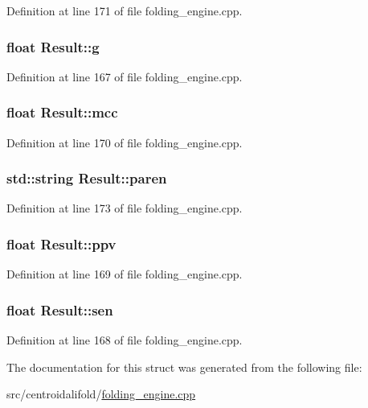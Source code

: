 Definition at line 171 of file folding\+\_\+engine.\+cpp.

\hypertarget{struct_result_abc9ebc61c9bf5c894e28a41bbded49df}{
\subsubsection[{g}]{\setlength{\rightskip}{0pt plus 5cm}float Result\+::g}}\label{struct_result_abc9ebc61c9bf5c894e28a41bbded49df}


Definition at line 167 of file folding\+\_\+engine.\+cpp.

\hypertarget{struct_result_ab1732680ae2f2470872d1271303928a7}{
\subsubsection[{mcc}]{\setlength{\rightskip}{0pt plus 5cm}float Result\+::mcc}}\label{struct_result_ab1732680ae2f2470872d1271303928a7}


Definition at line 170 of file folding\+\_\+engine.\+cpp.

\hypertarget{struct_result_aac6267b349ffcbfc9407fb349f3e8ee2}{
\subsubsection[{paren}]{\setlength{\rightskip}{0pt plus 5cm}std\+::string Result\+::paren}}\label{struct_result_aac6267b349ffcbfc9407fb349f3e8ee2}


Definition at line 173 of file folding\+\_\+engine.\+cpp.

\hypertarget{struct_result_a7e3e0b23b5aa1d1238ecc84bb22c4730}{
\subsubsection[{ppv}]{\setlength{\rightskip}{0pt plus 5cm}float Result\+::ppv}}\label{struct_result_a7e3e0b23b5aa1d1238ecc84bb22c4730}


Definition at line 169 of file folding\+\_\+engine.\+cpp.

\hypertarget{struct_result_a4e5d7f0713c789685bc004d2ba2ce13a}{
\subsubsection[{sen}]{\setlength{\rightskip}{0pt plus 5cm}float Result\+::sen}}\label{struct_result_a4e5d7f0713c789685bc004d2ba2ce13a}


Definition at line 168 of file folding\+\_\+engine.\+cpp.



The documentation for this struct was generated from the following file\+:\begin{DoxyCompactItemize}
\item 
src/centroidalifold/\hyperlink{folding__engine_8cpp}{folding\+\_\+engine.\+cpp}\end{DoxyCompactItemize}
